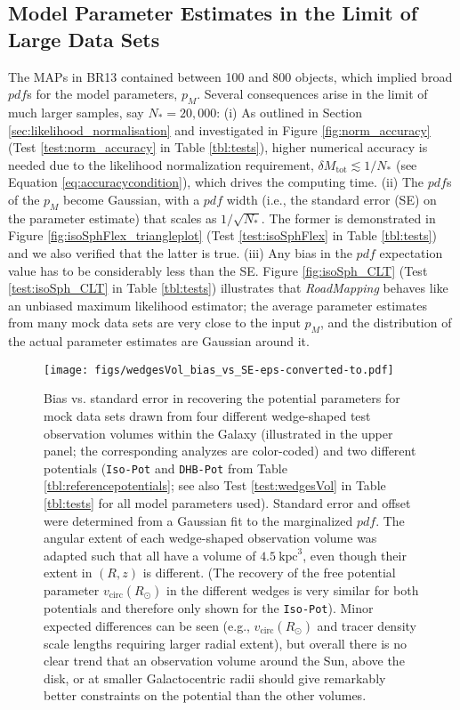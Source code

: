 \documentclass[iop,revtex4,numberedappendix,appendixfloats]{emulateapj}
\newcommand{\pdf}{\ensuremath{pdf}}
\newcommand{\pmodel}{\ensuremath{p_M}}
\newcommand{\MAP}{MAP}
\newcommand{\RM}{{\sl RoadMapping}}
\begin{document}
\subsection{Model Parameter Estimates in the Limit of Large Data Sets} \label{sec:largedata}

The \MAP{}s in BR13 contained between 100 and 800 objects, which implied broad \pdf{}s for the model parameters, $\pmodel{}$. Several consequences arise in the limit of much larger samples, say $N_{*} = 20,000$: (i) As outlined in Section \ref{sec:likelihood_normalisation} and investigated in Figure \ref{fig:norm_accuracy} (Test \ref{test:norm_accuracy} in Table \ref{tbl:tests}), higher numerical accuracy is needed due to the likelihood normalization requirement, $\delta M_\text{tot} \lesssim 1/N_{*}$ (see Equation \eqref{eq:accuracycondition}), which drives the computing time. (ii) The \pdf{}s of the \pmodel{} become Gaussian, with a \pdf{} width (i.e., the standard error (SE) on the parameter estimate) that scales as $1/\sqrt{N_{*}}$. The former is demonstrated in Figure \ref{fig:isoSphFlex_triangleplot} (Test \ref{test:isoSphFlex} in Table \ref{tbl:tests}) and we also verified that the latter is true. (iii) Any bias in the \pdf{} expectation value has to be considerably less than the SE. Figure \ref{fig:isoSph_CLT} (Test \ref{test:isoSph_CLT} in Table \ref{tbl:tests}) illustrates that \RM{} behaves like an unbiased maximum likelihood estimator; the average parameter estimates from many mock data sets are very close to the input \pmodel{}, and the distribution of the actual parameter estimates are Gaussian around it.

\begin{figure}[!htbp]
\centering
\texttt{[image: figs/wedgesVol\_bias\_vs\_SE-eps-converted-to.pdf]}
\caption{Bias vs. standard error in recovering the potential parameters for mock data sets drawn from four different wedge-shaped test observation volumes within the Galaxy (illustrated in the upper panel; the corresponding analyzes are color-coded) and two different potentials (\texttt{Iso-Pot} and \texttt{DHB-Pot} from Table \ref{tbl:referencepotentials}; see also Test \ref{test:wedgesVol} in Table \ref{tbl:tests} for all model parameters used). Standard error and offset were determined from a Gaussian fit to the marginalized \pdf{}. The angular extent of each wedge-shaped observation volume was adapted such that all have a volume of $4.5~\text{kpc}^3$, even though their extent in $(R,z)$ is different. (The recovery of the free potential parameter $v_\text{circ}(R_\odot)$ in the different wedges is very similar for both potentials and therefore only shown for the \texttt{Iso-Pot}). Minor expected differences can be seen (e.g., $v_\text{circ}(R_\odot)$ and tracer density scale lengths requiring larger radial extent), but overall there is no clear trend that an observation volume around the Sun, above the disk, or at smaller Galactocentric radii should give remarkably better constraints on the potential than the other volumes.}
\label{fig:wedgesVol_bias_vs_SE}
\end{figure}
\end{document}

